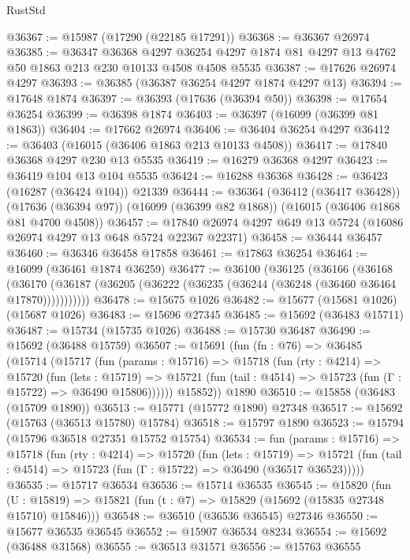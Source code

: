 \begin{lexlean}{RustStd}
\begin{coremodule}
@36367 := @15987 (@17290 (@22185 @17291))
@36368 := @36367 @26974
@36385 := @36347
    @36368
    @4297
    @36254
    @4297
    @1874
    @81
    @4297
    @13
    @4762
    @50
    @1863
    @213
    @230
    @10133
    @4508
    @4508
    @5535
@36387 := @17626 @26974 @4297
@36393 := @36385 (@36387 @36254 @4297 @1874 @4297 @13)
@36394 := @17648 @1874
@36397 := @36393 (@17636 (@36394 @50))
@36398 := @17654 @36254
@36399 := @36398 @1874
@36403 := @36397 (@16099 (@36399 @81 @1863))
@36404 := @17662 @26974
@36406 := @36404 @36254 @4297
@36412 := @36403 (@16015 (@36406 @1863 @213 @10133 @4508))
@36417 := @17840 @36368 @4297 @230 @13 @5535
@36419 := @16279 @36368 @4297
@36423 := @36419 @104 @13 @104 @5535
@36424 := @16288 @36368
@36428 := @36423 (@16287 (@36424 @104)) @21339
@36444 := @36364
    (@36412 (@36417 @36428))
    (@17636 (@36394 @97))
    (@16099 (@36399 @82 @1868))
    (@16015 (@36406 @1868 @81 @4700 @4508))
@36457 := @17840 @26974 @4297 @649 @13 @5724 (@16086 @26974 @4297 @13 @648 @5724 @22367 @22371)
@36458 := @36444 @36457
@36460 := @36346 @36458 @17858
@36461 := @17863 @36254
@36464 := @16099 (@36461 @1874 @36259)
@36477 := @36100
    (@36125
      (@36166
        (@36168
          (@36170 (@36187 (@36205 (@36222 (@36235 (@36244 (@36248 (@36460 @36464 @17870)))))))))))
@36478 := @15675 @1026
@36482 := @15677 (@15681 @1026) (@15687 @1026)
@36483 := @15696 @27345
@36485 := @15692 (@36483 @15711)
@36487 := @15734 (@15735 @1026)
@36488 := @15730 @36487
@36490 := @15692 (@36488 @15759)
@36507 := @15691
    (fun (fn : @76) =>
    @36485
      (@15714
        (@15717
          (fun (params : @15716) =>
          @15718
            (fun (rty : @4214) =>
            @15720
              (fun (lets : @15719) =>
              @15721 (fun (tail : @4514) => @15723 (fun (Γ : @15722) => @36490 @15806))))))
        @15852))
    @1890
@36510 := @15858 (@36483 (@15709 @1890))
@36513 := @15771 (@15772 @1890) @27348
@36517 := @15692 (@15763 (@36513 @15780) @15784)
@36518 := @15797 @1890
@36523 := @15794 (@15796 @36518 @27351 @15752 @15754)
@36534 := fun (params : @15716) =>
  @15718
    (fun (rty : @4214) =>
    @15720
      (fun (lets : @15719) =>
      @15721 (fun (tail : @4514) => @15723 (fun (Γ : @15722) => @36490 (@36517 @36523)))))
@36535 := @15717 @36534
@36536 := @15714 @36535
@36545 := @15820
    (fun (U : @15819) => @15821 (fun (t : @7) => @15829 (@15692 (@15835 @27348 @15710) @15846)))
@36548 := @36510 (@36536 @36545) @27346
@36550 := @15677 @36535 @36545
@36552 := @15907 @36534 @8234
@36554 := @15692 (@36488 @31568)
@36555 := @36513 @31571
@36556 := @15763 @36555

\end{coremodule}
\end{lexlean}
